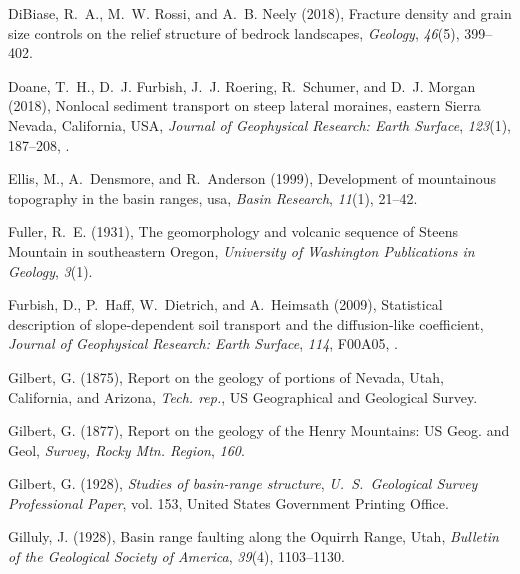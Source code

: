 \begin{thebibliography}{50}
DiBiase, R.~A., M.~W. Rossi, and A.~B. Neely (2018), Fracture density and grain
  size controls on the relief structure of bedrock landscapes,
  \textit{Geology}, \textit{46}(5), 399--402.

Doane, T.~H., D.~J. Furbish, J.~J. Roering, R.~Schumer, and D.~J. Morgan
  (2018), {Nonlocal sediment transport on steep lateral moraines, eastern
  Sierra Nevada, California, USA}, \textit{Journal of Geophysical Research:
  Earth Surface}, \textit{123}(1), 187--208, .

Ellis, M., A.~Densmore, and R.~Anderson (1999), Development of mountainous
  topography in the basin ranges, usa, \textit{Basin Research}, \textit{11}(1),
  21--42.

Fuller, R.~E. (1931), {The geomorphology and volcanic sequence of Steens
  Mountain in southeastern Oregon}, \textit{University of Washington
  Publications in Geology}, \textit{3}(1).

Furbish, D., P.~Haff, W.~Dietrich, and A.~Heimsath (2009), Statistical
  description of slope-dependent soil transport and the diffusion-like
  coefficient, \textit{Journal of Geophysical Research: Earth Surface},
  \textit{114}, F00A05, .

Gilbert, G. (1875), {Report on the geology of portions of Nevada, Utah,
  California, and Arizona}, \textit{Tech. rep.}, US Geographical and Geological
  Survey.

Gilbert, G. (1877), {Report on the geology of the Henry Mountains: US Geog. and
  Geol}, \textit{Survey, Rocky Mtn. Region}, \textit{160}.

Gilbert, G. (1928), \textit{Studies of basin-range structure}, \textit{U.~S.\
  Geological Survey Professional Paper}, vol. 153, United States Government
  Printing Office.

Gilluly, J. (1928), {Basin range faulting along the Oquirrh Range, Utah},
  \textit{Bulletin of the Geological Society of America}, \textit{39}(4),
  1103--1130.


\end{thebibliography}
